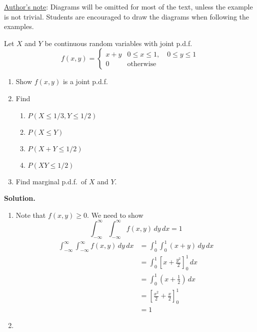 \underline{Author's note}: Diagrams will be omitted for most of the text,
unless the example is not trivial. Students are encouraged
to draw the diagrams when following the examples.
\begin{Example}{}{}
    Let $ X $ and $ Y $ be continuous random variables
    with joint p.d.f.\
    \[ f(x,y)=
        \begin{cases}
            x+y & 0\leqslant x\leqslant 1,\quad 0\leqslant y\leqslant 1 \\
            0   & \text{otherwise}
        \end{cases} \]
    \begin{enumerate}[label=(\roman*)]
        \item Show $ f(x,y) $ is a joint p.d.f.\
        \item Find
              \begin{enumerate}[label=(\alph*)]
                  \item $ P(X\leqslant 1/3, Y\leqslant 1/2) $
                  \item $ P(X\leqslant Y) $
                  \item $ P(X+Y\leqslant 1/2) $
                  \item $ P(XY\leqslant 1/2) $
              \end{enumerate}
        \item Find marginal p.d.f.\ of $ X $ and $ Y $.
    \end{enumerate}
    \textbf{Solution.}
    \begin{enumerate}[label=(\roman*)]
        \item Note that $ f(x,y)\geqslant 0 $. We need to show
              \[ \int_{-\infty}^{\infty} \int_{-\infty}^{\infty} f(x,y)\, d{y} \, d{x} =1 \]
              \begin{align*}
                  \int_{-\infty}^{\infty} \int_{-\infty}^{\infty} f(x,y)\, d{y} \, d{x}
                   & =\int_{0}^{1} \int_{0}^{1} (x+y)\, d{y} \, d{x}         \\
                   & =\int_{0}^{1} \left[ x+\frac{y^2}{2} \right]_0^1\, d{x} \\
                   & =\int_{0}^{1} \left( x+\frac{1}{2} \right)\, d{x}       \\
                   & =\left[ \frac{x^2}{2}  +\frac{x}{2}\right]_0^1          \\
                   & =1
              \end{align*}
        \item \begin{enumerate}[label=(\alph*)]

\end{enumerate}
\end{enumerate}
\end{Example}
